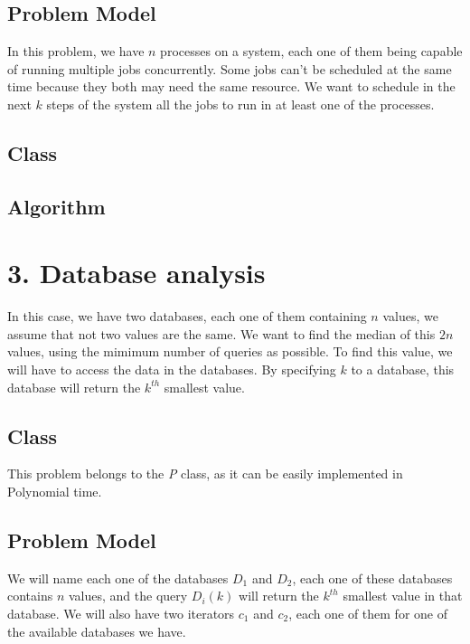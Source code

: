 \documentclass{article}
\begin{document}
\subsection*{Problem Model}

In this problem, we have $n$ processes on a system, each one of them being capable of running multiple jobs concurrently. Some jobs can't be scheduled at the same time because they both may need the same resource. We want to schedule in the next $k$ steps of the system all the jobs to run in at least one of the processes.

\subsection*{Class}

\subsection*{Algorithm}

\section*{3. Database analysis}

In this case, we have two databases, each one of them containing $n$ values, we assume that not two values are the same. We want to find the median of this $2n$ values, using the mimimum number of queries as possible. To find this value, we will have to access the data in the databases. By specifying $k$ to a database, this database will return the $k^{th}$ smallest value.

\subsection*{Class}

This problem belongs to the \textit{P} class, as it can be easily implemented in Polynomial time.

\subsection*{Problem Model}

We will name each one of the databases $D_1$ and $D_2$, each one of these databases contains $n$ values, and the query $D_i(k)$ will return the $k^{th}$ smallest value in that database. We will also have two iterators $c_1$ and $c_2$, each one of them for one of the available databases we have.
\end{document}
